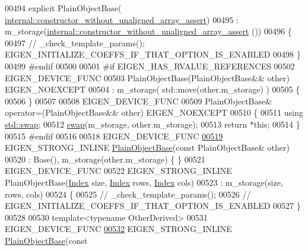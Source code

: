 \begin{DoxyCode}
00494     \textcolor{keyword}{explicit} PlainObjectBase(
      \hyperlink{struct_eigen_1_1internal_1_1constructor__without__unaligned__array__assert}{internal::constructor\_without\_unaligned\_array\_assert})
00495       : m\_storage(\hyperlink{struct_eigen_1_1internal_1_1constructor__without__unaligned__array__assert}{internal::constructor\_without\_unaligned\_array\_assert}
      ())
00496     \{
00497 \textcolor{comment}{//       \_check\_template\_params(); EIGEN\_INITIALIZE\_COEFFS\_IF\_THAT\_OPTION\_IS\_ENABLED}
00498     \}
00499 \textcolor{preprocessor}{#endif}
00500 
00501 \textcolor{preprocessor}{#if EIGEN\_HAS\_RVALUE\_REFERENCES}
00502     EIGEN\_DEVICE\_FUNC
00503     PlainObjectBase(PlainObjectBase&& other) EIGEN\_NOEXCEPT
00504       : m\_storage( std::move(other.m\_storage) )
00505     \{
00506     \}
00507 
00508     EIGEN\_DEVICE\_FUNC
00509     PlainObjectBase& operator=(PlainObjectBase&& other) EIGEN\_NOEXCEPT
00510     \{
00511       \textcolor{keyword}{using} \hyperlink{endian_8c_a3ca5ecd34b04d6a243c054ac3a57f68d}{std::swap};
00512       \hyperlink{endian_8c_a3ca5ecd34b04d6a243c054ac3a57f68d}{swap}(m\_storage, other.m\_storage);
00513       \textcolor{keywordflow}{return} *\textcolor{keyword}{this};
00514     \}
00515 \textcolor{preprocessor}{#endif}
00516 
00518     EIGEN\_DEVICE\_FUNC
\hyperlink{class_eigen_1_1_plain_object_base_a69656a28768b9b6f8b283e251d3552be}{00519}     EIGEN\_STRONG\_INLINE \hyperlink{class_eigen_1_1_plain_object_base_a69656a28768b9b6f8b283e251d3552be}{PlainObjectBase}(\textcolor{keyword}{const} PlainObjectBase& other)
00520       : Base(), m\_storage(other.m\_storage) \{ \}
00521     EIGEN\_DEVICE\_FUNC
00522     EIGEN\_STRONG\_INLINE PlainObjectBase(\hyperlink{namespace_eigen_a62e77e0933482dafde8fe197d9a2cfde}{Index} size, \hyperlink{namespace_eigen_a62e77e0933482dafde8fe197d9a2cfde}{Index} rows, \hyperlink{namespace_eigen_a62e77e0933482dafde8fe197d9a2cfde}{Index} cols)
00523       : m\_storage(size, rows, cols)
00524     \{
00525 \textcolor{comment}{//       \_check\_template\_params();}
00526 \textcolor{comment}{//       EIGEN\_INITIALIZE\_COEFFS\_IF\_THAT\_OPTION\_IS\_ENABLED}
00527     \}
00528 
00530     \textcolor{keyword}{template}<\textcolor{keyword}{typename} OtherDerived>
00531     EIGEN\_DEVICE\_FUNC
\hyperlink{class_eigen_1_1_plain_object_base_a82cdb1b9d5c90c2002cb5086c03c29fa}{00532}     EIGEN\_STRONG\_INLINE \hyperlink{class_eigen_1_1_plain_object_base_a82cdb1b9d5c90c2002cb5086c03c29fa}{PlainObjectBase}(\textcolor{keyword}{const} 

\end{DoxyCode}
